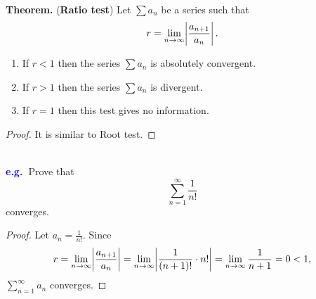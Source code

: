 \documentclass[12pt,a4paper]{article}
\newcommand{\dispsty}{\displaystyle}
\newcommand{\eg}{\textcolor{blue}{\bf e.g.\ \quad }}
\begin{document}
\
\begin{tcolorbox}[colback=white]
	\textbf{Theorem.} (\textbf{Ratio test}) Let $\sum a_n$ be a series such that \[
	r=\lim\limits_{n\to\infty}\abs{\frac{a_{n+1}}{a_n}}.
	\]\begin{enumerate}
		\item If $r<1$ then the series $\sum a_n$ is absolutely convergent.
		\item If $r>1$ then the series $\sum a_n$ is divergent.
		\item If $r=1$ then this test gives no information.
	\end{enumerate}\tcblower\begin{proof}
		It is similar to Root test.
	\end{proof}
\end{tcolorbox}\
\\
\eg Prove that \[
\sum_{n=1}^\infty\frac{1}{n!}
\] converges.\begin{proof}
	Let $a_n=\dispsty\frac{1}{n!}$. Since \[
	r=\lim\limits_{n\to\infty}\abs{\frac{a_{n+1}}{a_n}}=\lim\limits_{n\to\infty}\abs{\frac{1}{(n+1)!}\cdot n!} = \lim\limits_{n\to\infty}\frac{1}{n+1}=0<1,
	\] $\sum_{n=1}^\infty a_n$ converges.
\end{proof}

\newpage
\end{document}

